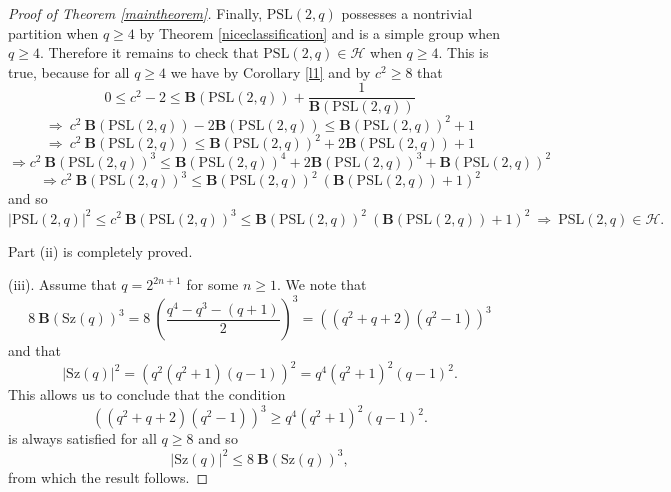\documentclass{amsart}
\theoremstyle{definition}
\numberwithin{equation}{section}
\begin{document}
\begin{proof}[Proof of Theorem \ref{maintheorem}]
Finally, $\mathrm{PSL}(2,q)$ possesses a nontrivial partition when $q \ge 4$ by Theorem \ref{niceclassification} and is a simple group when $q \ge 4$. Therefore it remains to check that $\mathrm{PSL}(2,q) \in \mathcal{H}$ when $q \ge 4$.   This is true, because for all $q \ge 4$ we have by Corollary \ref{l1} and by $c^2 \ge 8 $ that
\begin{equation} 0 \le c^2 -2   \le  {\mathbf{B}(\mathrm{PSL}(2,q))} + \frac{1}{\mathbf{B}(\mathrm{PSL}(2,q))}
\end{equation}   
\begin{equation}
\Longrightarrow  \  c^2 \  {\mathbf{B}(\mathrm{PSL}(2,q))}  - 2  {\mathbf{B}(\mathrm{PSL}(2,q))} \le  {\mathbf{B}(\mathrm{PSL}(2,q))}^2  +1  
\end{equation}   
\begin{equation}
   \Longrightarrow  \  c^2 \  {\mathbf{B}(\mathrm{PSL}(2,q))} \le  {\mathbf{B}(\mathrm{PSL}(2,q))}^2 + 2  {\mathbf{B}(\mathrm{PSL}(2,q))} +1  
   \end{equation}   
\begin{equation}
 \Longrightarrow  c^2  \ \mathbf{B}(\mathrm{PSL}(2,q))^3 \le   \mathbf{B}(\mathrm{PSL}(2,q))^4 +  2  \mathbf{B}(\mathrm{PSL}(2,q))^3 +    \mathbf{B}(\mathrm{PSL}(2,q))^2 
 \end{equation}   
\begin{equation}
 \Longrightarrow  c^2  \ \mathbf{B}(\mathrm{PSL}(2,q))^3 \le   {\mathbf{B}(\mathrm{PSL}(2,q))}^2  \ {( \mathbf{B}(\mathrm{PSL}(2,q))+1)}^2
 \end{equation}   
and so
\begin{equation}
|\mathrm{PSL}(2,q)|^2  \le  c^2  \ \mathbf{B}(\mathrm{PSL}(2,q))^3 \le   {\mathbf{B}(\mathrm{PSL}(2,q))}^2  \ {( \mathbf{B}(\mathrm{PSL}(2,q)) + 1)}^2   \ \Longrightarrow \ \mathrm{PSL}(2,q) \in \mathcal{H}.
\end{equation}   

Part (ii) is completely proved.



\medskip
\medskip
\medskip
\medskip
\medskip
\medskip
\medskip
\medskip

(iii). Assume that $q=2^{2n+1}$ for some $n \ge 1$.  We note that
\begin{equation}8 \ \mathbf{B}(\mathrm{Sz}(q))^3 = 8 \  \left(\frac{q^4-q^3-(q+1)}{2}\right)^3=  ((q^2+q+2)(q^2-1))^3
\end{equation}
and that
\begin{equation}|\mathrm{Sz}(q)|^2= (q^2(q^2+1)(q-1))^2=q^4(q^2+1)^2(q-1)^2.  \end{equation}
This allows us to conclude that the condition
\begin{equation} ((q^2+q+2)(q^2-1))^3 \ge  q^4(q^2+1)^2(q-1)^2.
\end{equation} 
is always satisfied for all $q \ge 8$ and so
\begin{equation}|\mathrm{Sz}(q)|^2  \le  8  \ \mathbf{B}(\mathrm{Sz}(q))^3,
\end{equation}
from which the result follows. 


\end{proof}
\end{document}
